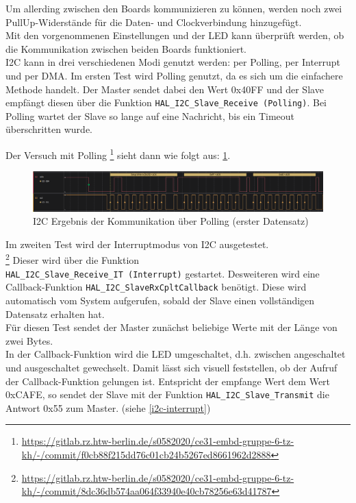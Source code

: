 \documentclass[11pt,a4paper,titlepage]{article}
\begin{document}
Um allerding zwischen den Boards kommunizieren zu können, werden noch zwei PullUp-Widerstände für die Daten- und Clockverbindung hinzugefügt.\\

Mit den vorgenommenen Einstellungen und der LED kann überprüft werden, ob die Kommunikation zwischen beiden Boards funktioniert.\\

I2C kann in drei verschiedenen Modi genutzt werden: per Polling, per Interrupt und per DMA.
Im ersten Test wird Polling genutzt, da es sich um die einfachere Methode handelt.
Der Master sendet dabei den Wert 0x40FF und der Slave empfängt diesen über die Funktion \texttt{HAL\_I2C\_Slave\_Receive (Polling)}.
Bei Polling wartet der Slave so lange auf eine Nachricht, bis ein Timeout überschritten wurde.

Der Versuch mit Polling
\footnote{\url{https://gitlab.rz.htw-berlin.de/s0582020/ce31-embd-gruppe-6-tz-kh/-/commit/f0cb88f215dd76c01cb24b5267ed8661962d2888}}
sieht dann wie folgt aus: \cref{i2c}.

\begin{figure}[h]
    \begin{center}
        \includegraphics[width=1.1\textwidth]{Bilder/i2c_pollling.png}
        \caption{I2C Ergebnis der Kommunikation über Polling (erster Datensatz)}
        \label{i2c}
    \end{center}
\end{figure}

Im zweiten Test wird der Interruptmodus von I2C ausgetestet.\\
\footnote{\url{https://gitlab.rz.htw-berlin.de/s0582020/ce31-embd-gruppe-6-tz-kh/-/commit/8dc36db574aa064f33940e40cb78256e63d41787}}
Dieser wird über die Funktion \\\texttt{HAL\_I2C\_Slave\_Receive\_IT (Interrupt)} gestartet.
Desweiteren wird eine Callback-Funktion \texttt{HAL\_I2C\_SlaveRxCpltCallback} benötigt.
Diese wird automatisch vom System aufgerufen, sobald der Slave einen vollständigen Datensatz erhalten hat.\\

Für diesen Test sendet der Master zunächst beliebige Werte mit der Länge von zwei Bytes.\\
In der Callback-Funktion wird die LED umgeschaltet, d.h. zwischen angeschaltet und ausgeschaltet gewechselt.
Damit lässt sich visuell feststellen, ob der Aufruf der Callback-Funktion gelungen ist.
Entspricht der empfange Wert dem Wert 0xCAFE, 
so sendet der Slave mit der Funktion \texttt{HAL\_I2C\_Slave\_Transmit} die Antwort 0x55 zum Master. (siehe \cref{i2c-interrupt})
\end{document}
